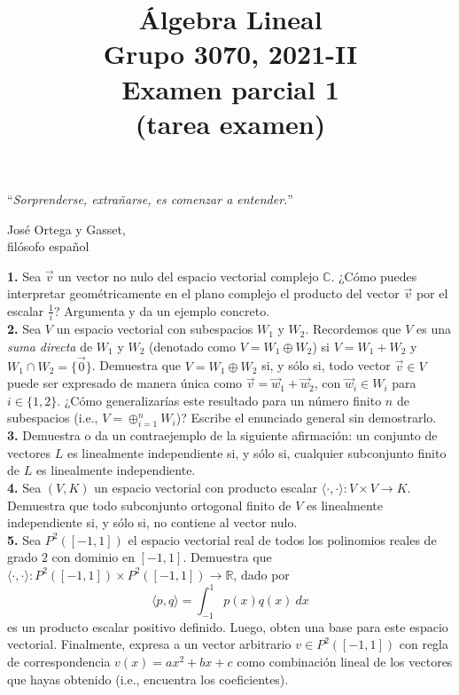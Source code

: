 \documentclass[a4paper]{article}
\begin{document}
\title{Álgebra Lineal \\ Grupo 3070, 2021-II \\ Examen parcial 1 \\ (tarea examen)}
\date{}
\maketitle

\epigraph{``\textit{Sorprenderse, extrañarse, es comenzar a entender.}''}{\textemdash José Ortega y Gasset, \\ filósofo español}

\vspace{2cm}
\textbf{1.} Sea $\vec{v}$ un vector no nulo del espacio vectorial complejo $\mathbb{C}$. ¿Cómo puedes interpretar geométricamente en el plano complejo el producto del vector $\vec{v}$ por el escalar $\frac{1}{i}$? Argumenta y da un ejemplo concreto. \\

\textbf{2.} Sea $V$ un espacio vectorial con subespacios $W_1$ y $W_2$. Recordemos que $V$ es una \emph{suma directa} de $W_1$ y $W_2$ (denotado como $V = W_1 \oplus W_2$) si $V=W_1+W_2$ y $W_1\cap W_2=\{\vec{0}\}$. Demuestra que $V = W_1 \oplus W_2$ si, y sólo si, todo vector $\vec{v}\in V$ puede ser expresado de manera única como $\vec{v} = \vec{w}_1 + \vec{w}_2$, con $\vec{w}_i\in W_i$ para $i\in\{1,2\}$. ¿Cómo generalizarías este resultado para un número finito $n$ de subespacios (i.e., $V = \oplus_{i=1}^n W_i$)? Escribe el enunciado general sin demostrarlo. \\

\textbf{3.} Demuestra o da un contraejemplo de la siguiente afirmación: un conjunto de vectores $L$ es linealmente independiente si, y sólo si, cualquier subconjunto finito de $L$ es linealmente independiente. \\

\textbf{4.} Sea $(V,K)$ un espacio vectorial con producto escalar $\langle \cdot , \cdot \rangle:V\times V\to K$. Demuestra que todo subconjunto ortogonal finito de $V$ es linealmente independiente si, y sólo si, no contiene al vector nulo. \\

\textbf{5.} Sea $P^2([-1,1])$ el espacio vectorial real de todos los polinomios reales de grado $2$ con dominio en $[-1,1]$. Demuestra que $\langle \cdot , \cdot \rangle:P^2([-1,1])\times P^2([-1,1])\to\mathbb{R}$, dado por
\[
\langle p , q \rangle = \int_{-1}^1 p(x)q(x) \ dx
\] 
es un producto escalar positivo definido. Luego, obten una base para este espacio vectorial. Finalmente, expresa a un vector arbitrario $v\in P^2([-1,1])$ con regla de correspondencia $v(x)=ax^2 + bx + c$ como combinación lineal de los vectores que hayas obtenido (i.e., encuentra los coeficientes). \\
\end{document}
